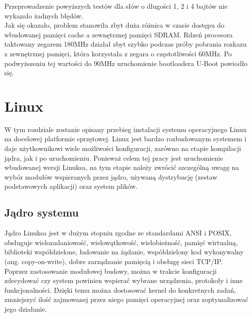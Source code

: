\documentclass[a4paper,12pt]{book}
\begin{document}
				Przeprowadzenie powyższych testów dla słów o długości 1, 2 i 4 bajtów nie wykazało żadnych błędów.\\
				Jak się okazało, problem stanowiła zbyt duża różnica w czasie dostępu do wbudowanej pamięci cache a zewnętrznej pamięci SDRAM. Rdzeń procesora taktowany zegarem 180MHz działał zbyt szybko podczas próby pobrania rozkazu z zewnętrznej pamięci, która korzystała z zegara o częstotliwości 60MHz. Po podwyższeniu tej wartości do 90MHz uruchomienie bootloadera U-Boot powiodło się.
		\section{Linux}
			W tym rozdziale zostanie opisany przebieg instalacji systemu operacyjnego Linux na docelowej platformie sprzętowej. Linux jest bardzo rozbudowanym systemem i daje użytkownikowi wiele możliwości konfiguracji, zarówno na etapie kompilacji jądra, jak i po uruchomieniu. Ponieważ celem tej pracy jest uruchomienie wbudowanej wersji Linuksa, na tym etapie należy zwrócić szczególną uwagę na wybór modułów wspieranych przez jądro, używaną dystrybucję (zestaw podstawowych aplikacji) oraz system plików.
			\subsection{Jądro systemu}
				\label{sec:linux_kernel}
				Jądro Linuksa jest w dużym stopniu zgodne ze standardami ANSI i POSIX, obsługuje wielozadaniowość, wielowątkowość, wielobieżność, pamięć wirtualną, biblioteki współdzielone, ładowanie na żądanie, współdzielony kod wykonywalny (ang. copy-on-write), dobre zarządzanie pamięcią i obsługę sieci TCP/IP.\\
				Poprzez zastosowanie modułowej budowy, można w trakcie konfiguracji zdecydować czy system powinien wspierać wybrane urządzenia, protokoły i inne funkcjonalności. Dzięki temu można dostosować kernel do konkretnych zadań, zmniejszyć ilość zajmowanej przez niego pamięci operacyjnej oraz zoptymalizować jego działanie.
\end{document}
